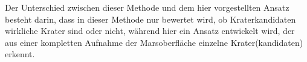 Der Unterschied zwischen dieser Methode und dem hier vorgestellten Ansatz besteht darin, dass in dieser Methode nur bewertet wird, ob Kraterkandidaten wirkliche Krater sind oder nicht, während hier ein Ansatz entwickelt wird, der aus einer kompletten Aufnahme der Marsoberfläche einzelne Krater(kandidaten) erkennt.

